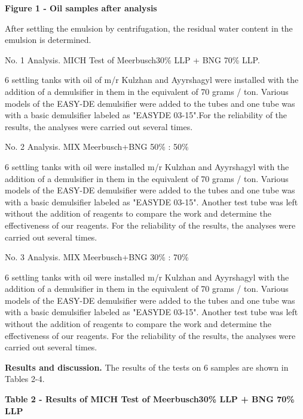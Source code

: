 {\bfseries Figure 1 - Oil samples after analysis}

After settling the emulsion by centrifugation, the residual water
content in the emulsion is determined.

No. 1 Analysis. MICH Test of Meerbusch30\% LLP + BNG 70\% LLP.

6 settling tanks with oil of m/r Kulzhan and Ayyrshagyl were installed
with the addition of a demulsifier in them in the equivalent of 70 grams
/ ton. Various models of the EASY-DE demulsifier were added to the tubes
and one tube was with a basic demulsifier labeled as "EASYDE 03-15".For
the reliability of the results, the analyses were carried out several
times.

No. 2 Analysis. MIX Meerbusch+BNG 50\% : 50\%

6 settling tanks with oil were installed m/r Kulzhan and Ayyrshagyl with
the addition of a demulsifier in them in the equivalent of 70 grams /
ton. Various models of the EASY-DE demulsifier were added to the tubes
and one tube was with a basic demulsifier labeled as "EASYDE 03-15".
Another test tube was left without the addition of reagents to compare
the work and determine the effectiveness of our reagents. For the
reliability of the results, the analyses were carried out several times.

No. 3 Analysis. MIX Meerbusch+BNG 30\% : 70\%

6 settling tanks with oil were installed m/r Kulzhan and Ayyrshagyl with
the addition of a demulsifier in them in the equivalent of 70 grams /
ton. Various models of the EASY-DE demulsifier were added to the tubes
and one tube was with a basic demulsifier labeled as "EASYDE 03-15".
Another test tube was left without the addition of reagents to compare
the work and determine the effectiveness of our reagents. For the
reliability of the results, the analyses were carried out several times.

{\bfseries Results and discussion.} The results of the tests on 6 samples
are shown in Tables 2-4.

{\bfseries Table 2 - Results of MICH Test of Meerbusch30\% LLP + BNG 70\%
LLP}


